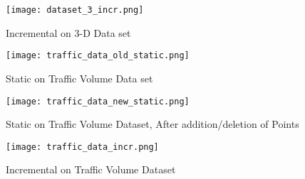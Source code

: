 \documentclass[acmsmall]{acmart}
\begin{document}
\begin{figure} [H]
\texttt{[image: dataset\_3\_incr.png]}
\caption{Incremental on 3-D Data set} 
\end{figure}
                    
\begin{figure} [H]
\texttt{[image: traffic\_data\_old\_static.png]}
\caption{Static on Traffic Volume Data set} 
\end{figure}
            
\begin{figure} [H]
\texttt{[image: traffic\_data\_new\_static.png]}
\caption{Static on Traffic Volume Dataset, After addition/deletion of Points} 
\end{figure}
            
\begin{figure} [H]
\texttt{[image: traffic\_data\_incr.png]}
\caption{Incremental on Traffic Volume Dataset} 
\end{figure}
\end{document}

